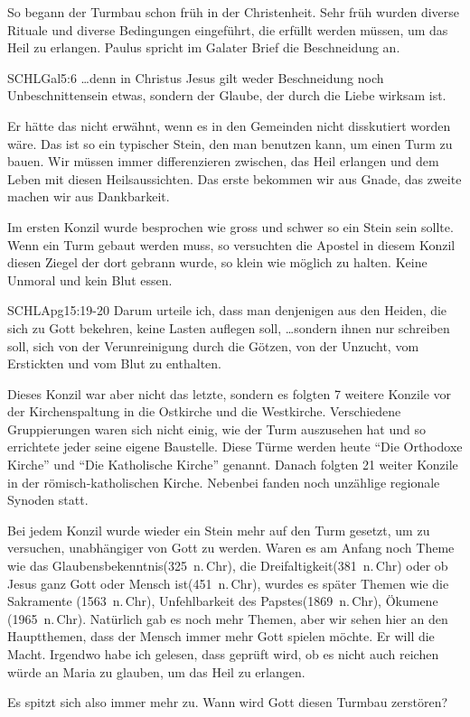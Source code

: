 \documentclass[14pt]{../../inc/mybib}
\newenvironment{block}[1][]{%
  \vspace{1.5em}%
  \noindent\textbf{#1}\par%
  \vspace{0.0em}%
}{%
  \vspace{1em}%
}
\begin{document}
\begin{block}
    So begann der Turmbau schon früh in der Christenheit. Sehr früh wurden diverse Rituale und diverse Bedingungen eingeführt, die erfüllt werden müssen, um das Heil zu erlangen. 
    Paulus spricht im Galater Brief die Beschneidung an.
    \begin{bibelbox}{SCHL}{Gal}{5:6}
        \dots denn in Christus Jesus gilt weder Beschneidung noch Unbeschnittensein etwas, sondern der Glaube, der durch die Liebe wirksam ist.
    \end{bibelbox}
    Er hätte das nicht erwähnt, wenn es in den Gemeinden nicht disskutiert worden wäre. Das ist so ein typischer Stein, den man benutzen kann, um einen Turm zu bauen. Wir müssen immer differenzieren zwischen, das Heil erlangen und dem Leben mit diesen Heilsaussichten. Das erste bekommen wir aus Gnade, das zweite machen wir aus Dankbarkeit.

    Im ersten Konzil wurde besprochen wie gross und schwer so ein Stein sein sollte. Wenn ein Turm gebaut werden muss, so versuchten die Apostel in diesem Konzil diesen Ziegel der dort gebrann wurde, so klein wie möglich zu halten. Keine Unmoral und kein Blut essen. 
    \begin{bibelbox}{SCHL}{Apg}{15:19-20}
        Darum urteile ich, dass man denjenigen aus den Heiden, die sich zu Gott bekehren, keine Lasten auflegen soll,
        \dots sondern ihnen nur schreiben soll, sich von der Verunreinigung durch die Götzen, von der Unzucht, vom Erstickten und vom Blut zu enthalten.
    \end{bibelbox}
    Dieses Konzil war aber nicht das letzte, sondern es folgten 7 weitere Konzile vor der Kirchenspaltung in die Ostkirche und die Westkirche. Verschiedene Gruppierungen waren sich nicht einig, wie der Turm auszusehen hat und so errichtete jeder seine eigene Baustelle. Diese Türme werden heute \enquote{Die Orthodoxe Kirche} und \enquote{Die Katholische Kirche} genannt. Danach folgten 21 weiter Konzile in der römisch-katholischen Kirche. Nebenbei fanden noch unzählige regionale Synoden statt.
    
    Bei jedem Konzil wurde wieder ein Stein mehr auf den Turm gesetzt, um zu versuchen, unabhängiger von Gott zu werden. Waren es am Anfang noch Theme wie das Glaubensbekenntnis(325~n.\,Chr), die Dreifaltigkeit(381~n.\,Chr) oder ob Jesus ganz Gott oder Mensch ist(451~n.\,Chr), wurdes es später Themen wie die Sakramente (1563~n.\,Chr), Unfehlbarkeit des Papstes(1869~n.\,Chr), Ökumene (1965~n.\,Chr). Natürlich gab es noch mehr Themen, aber wir sehen hier an den Hauptthemen, dass der Mensch immer mehr Gott spielen möchte. Er will die Macht.
    Irgendwo habe ich gelesen, dass geprüft wird, ob es nicht auch reichen würde an Maria zu glauben, um das Heil zu erlangen.
    
    Es spitzt sich also immer mehr zu. Wann wird Gott diesen Turmbau zerstören?
\end{block}
\end{document}
